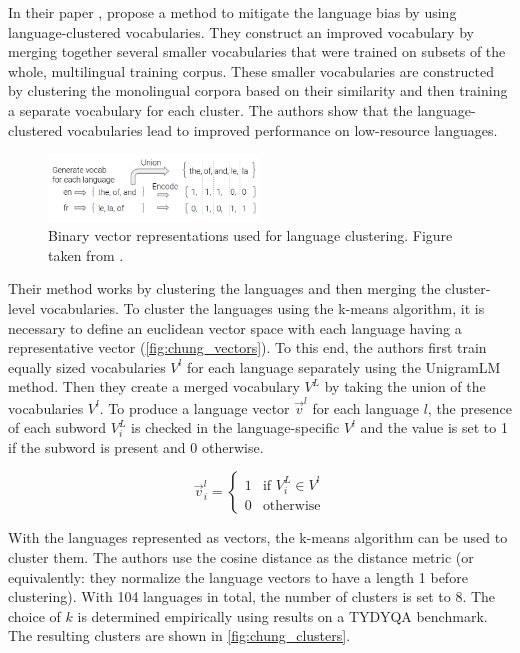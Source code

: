 In their paper  \cite{chung_improving_2020}, \citeauthor{chung_improving_2020} propose a method to mitigate the language bias by using language-clustered vocabularies. They construct an improved vocabulary by merging together several smaller vocabularies that were trained on subsets of the whole, multilingual training corpus. These smaller vocabularies are constructed by clustering the monolingual corpora based on their similarity and then training a separate vocabulary for each cluster. The authors show that the language-clustered vocabularies lead to improved performance on low-resource languages.


\begin{figure}[ht]
    \centering
    \includegraphics[width=0.5\textwidth]{img/temp/chung_language_vectors.png}
    \caption{Binary vector representations used for language clustering. Figure taken from \cite{chung_improving_2020}.}
    \label{fig:chung_vectors}
\end{figure}

Their method works by clustering the languages and then merging the cluster-level vocabularies. To cluster the languages using the k-means algorithm, it is necessary to define an euclidean vector space with each language having a representative vector (\autoref{fig:chung_vectors}). To this end, the authors first train equally sized vocabularies $V^l$ for each language separately using the UnigramLM method. Then they create a merged vocabulary $V^L$ by taking the union of the vocabularies $V^l$. To produce a language vector $\vec{v}^l$ for each language $l$, the presence of each subword $V^L_i$ is checked in the language-specific $V^l$ and the value is set to 1 if the subword is present and 0 otherwise.

\begin{equation}
    \vec{v}^l_i = \begin{cases}
        1 & \text{if } V^L_i \in V^l \\
        0 & \text{otherwise}
    \end{cases}
\end{equation}

With the languages represented as vectors, the k-means algorithm can be used to cluster them. The authors use the cosine distance as the distance metric (or equivalently: they normalize the language vectors to have a length 1 before clustering). With 104 languages in total, the number of clusters is set to 8. The choice of $k$ is determined empirically using results on a TYDYQA benchmark. The resulting clusters are shown in \autoref{fig:chung_clusters}.

